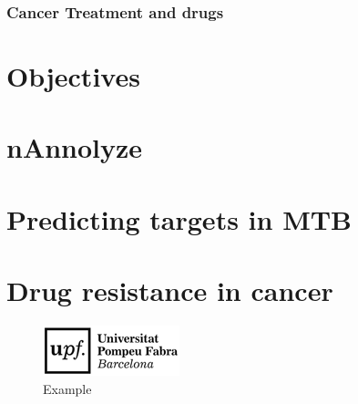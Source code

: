 \documentclass[12pt, a4paper,twoside]{tesi_upf}
\begin{document}
\subsection{Cancer Treatment and drugs}





\chapter{Objectives}
\chapter{nAnnolyze}
\chapter{Predicting targets in MTB}
\chapter{Drug resistance in cancer}



\begin{figure}[b]
  \centering
  \includegraphics[scale=0.5]{../figures/logo_upf.png}
    \caption{Example}
    \label{fig:logo}
\end{figure}





%



\backmatter
\printindex

\printbibliography
\end{document}
